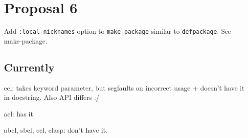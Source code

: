 \documentclass[11pt]{article}
\author{Grolter Bell}
\date{\today}
\title{}
\begin{document}
\tableofcontents

\section{Proposal 6}
\label{sec:orgb178e9d}
Add \texttt{:local-nicknames} option to \texttt{make-package} similar to \texttt{defpackage}. See
make-package.
\subsection{Currently}
\label{sec:orgb48de9e}
ecl: takes keyword parameter, but segfaults on incorrect usage + doesn't
have it in docstring. Also API differs :/

acl: has it

abcl, sbcl, ccl, clasp: don't have it.
\end{document}
